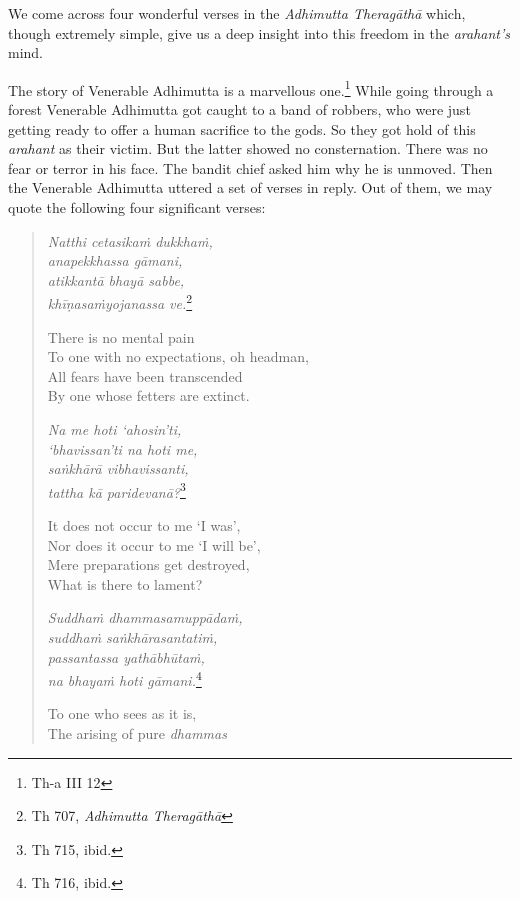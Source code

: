 We come across four wonderful verses in the \emph{Adhimutta Theragāthā} which, though extremely simple, give us a deep insight into this freedom in the \emph{arahant's} mind.

The story of Venerable Adhimutta is a marvellous one.\footnote{Th-a III 12} While going through a forest Venerable Adhimutta got caught to a band of robbers, who were just getting ready to offer a human sacrifice to the gods. So they got hold of this \emph{arahant} as their victim. But the latter showed no consternation. There was no fear or terror in his face. The bandit chief asked him why he is unmoved. Then the Venerable Adhimutta uttered a set of verses in reply. Out of them, we may quote the following four significant verses:

\begin{quote}
\emph{Natthi cetasikaṁ dukkhaṁ,}\\
\emph{anapekkhassa gāmani,}\\
\emph{atikkantā bhayā sabbe,}\\
\emph{khīṇasaṁyojanassa ve.}\footnote{Th 707, \emph{Adhimutta Theragāthā}}

There is no mental pain\\
To one with no expectations, oh headman,\\
All fears have been transcended\\
By one whose fetters are extinct.

\emph{Na me hoti `ahosin'ti,}\\
\emph{`bhavissan'ti na hoti me,}\\
\emph{saṅkhārā vibhavissanti,}\\
\emph{tattha kā paridevanā?}\footnote{Th 715, ibid.}

It does not occur to me `I was',\\
Nor does it occur to me `I will be',\\
Mere preparations get destroyed,\\
What is there to lament?

\emph{Suddhaṁ dhammasamuppādaṁ,}\\
\emph{suddhaṁ saṅkhārasantatiṁ,}\\
\emph{passantassa yathābhūtaṁ,}\\
\emph{na bhayaṁ hoti gāmani.}\footnote{Th 716, ibid.}

To one who sees as it is,\\
The arising of pure \emph{dhammas}

\clearpage


\end{quote}
